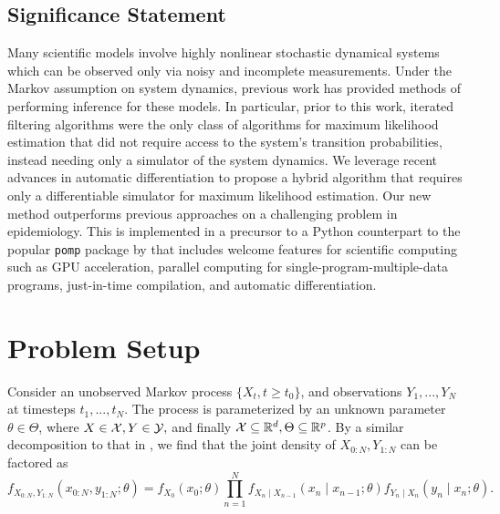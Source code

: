 \documentclass{article}
\begin{document}

\subsection{Significance Statement}
Many scientific models involve highly nonlinear stochastic dynamical systems which can be observed only via noisy and incomplete measurements. Under the Markov assumption on system dynamics, previous work has provided methods of performing inference for these models. In particular, prior to this work, iterated filtering algorithms were the only class of algorithms for maximum likelihood estimation that did not require access to the system's transition probabilities, instead needing only a simulator of the system dynamics. We leverage recent advances in automatic differentiation to propose a hybrid algorithm that requires only a differentiable simulator for maximum likelihood estimation. Our new method outperforms previous approaches on a challenging problem in epidemiology. This is implemented in a precursor to a Python counterpart to the popular \texttt{pomp} package by \citet{king16, king2017pompmanual} that includes welcome features for scientific computing such as GPU acceleration, parallel computing for single-program-multiple-data programs, just-in-time compilation, and automatic differentiation.


\section{Problem Setup}

Consider an unobserved Markov process $\{X_t, t \geq t_0\}$, and observations $Y_1,...,Y_N$ at timesteps $t_1,..., t_N$. The process is parameterized by an unknown parameter $\theta \in \Theta$, where $X \in {\mathcal{X}}, Y \in {\mathcal{Y}},$ and finally ${\mathcal{X}} \subseteq \mathbb{R}^d, \Theta \subseteq \mathbb{R}^p$. By a similar decomposition to that in \citet{doucet2009tutorial}, we find that the joint density of $X_{0:N}, Y_{1:N}$ can be factored as
$$f_{X_{0: N}, Y_{1: N}}\left(x_{0: N}, y_{1: N} ; \theta\right)=f_{X_0}\left(x_0 ; \theta\right) \prod_{n=1}^N f_{X_n \mid X_{n-1}}\left(x_n \mid x_{n-1} ; \theta\right) f_{Y_n \mid X_n}\left(y_n \mid x_n ; \theta\right).$$
\end{document}

